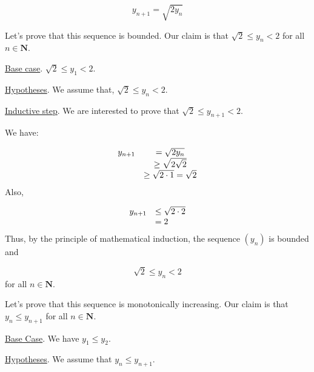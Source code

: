 \documentclass[10pt]{article}
\begin{document}
\begin{equation*}
y_{n+1} =\sqrt{2y_{n}}
\end{equation*}


Let's prove that this sequence is bounded. Our claim is that $\displaystyle \sqrt{2} \leq y_{n} < 2$ for all $\displaystyle n\in \mathbf{N}$.



\underline{Base case}. $\displaystyle \sqrt{2} \leq y_{1} < 2$.



\underline{Hypotheses}. We assume that, $\displaystyle \sqrt{2} \leq y_{n} < 2$.



\underline{Inductive step}. We are interested to prove that $\displaystyle \sqrt{2} \leq y_{n+1} < 2$.



We have:


\begin{equation*}
\begin{array}{ c c }
y_{n+1} & =\sqrt{2y_{n}}\\
 & \geq \sqrt{2\sqrt{2}}\\
 & \geq \sqrt{2\cdot 1} =\sqrt{2}
\end{array}
\end{equation*}
Also,


\begin{equation*}
\begin{array}{ c l }
y_{n+1} & \leq \sqrt{2\cdot 2}\\
 & =2
\end{array}
\end{equation*}
Thus, by the principle of mathematical induction, the sequence $\displaystyle ( y_{n})$ is bounded and 


\begin{equation*}
\sqrt{2} \leq y_{n} < 2
\end{equation*}
for all $\displaystyle n\in \mathbf{N}$.



Let's prove that this sequence is monotonically increasing. Our claim is that $\displaystyle y_{n} \leq y_{n+1}$ for all $\displaystyle n\in \mathbf{N}$.



\underline{Base Case}. We have $\displaystyle y_{1} \leq y_{2}$.



\underline{Hypotheses}. We assume that $\displaystyle y_{n} \leq y_{n+1}$.
\end{document}
